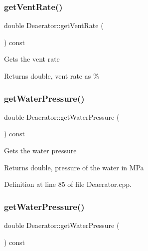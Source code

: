 \subsubsection{\texorpdfstring{get\+Vent\+Rate()}{getVentRate()}\hspace{0.1cm}{\footnotesize\ttfamily [3/3]}}
{\footnotesize\ttfamily double Deaerator\+::get\+Vent\+Rate (\begin{DoxyParamCaption}{ }\end{DoxyParamCaption}) const}

Gets the vent rate \begin{DoxyReturn}{Returns}
double, vent rate as \% 
\end{DoxyReturn}
\mbox{\label{class_deaerator_ae86ef305a8641d61ec76bd39bb84f28b}} 
\subsubsection{\texorpdfstring{get\+Water\+Pressure()}{getWaterPressure()}\hspace{0.1cm}{\footnotesize\ttfamily [1/3]}}
{\footnotesize\ttfamily double Deaerator\+::get\+Water\+Pressure (\begin{DoxyParamCaption}{ }\end{DoxyParamCaption}) const}

Gets the water pressure \begin{DoxyReturn}{Returns}
double, pressure of the water in M\+Pa 
\end{DoxyReturn}


Definition at line 85 of file Deaerator.\+cpp.

\mbox{\label{class_deaerator_ae86ef305a8641d61ec76bd39bb84f28b}} 
\subsubsection{\texorpdfstring{get\+Water\+Pressure()}{getWaterPressure()}\hspace{0.1cm}{\footnotesize\ttfamily [2/3]}}
{\footnotesize\ttfamily double Deaerator\+::get\+Water\+Pressure (\begin{DoxyParamCaption}{ }\end{DoxyParamCaption}) const}

